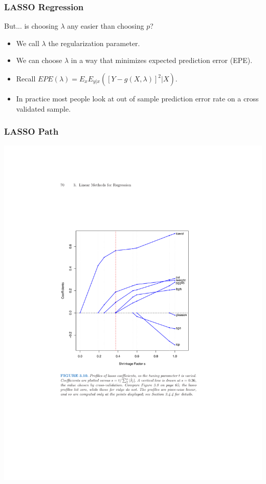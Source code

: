 \documentclass[xcolor=pdftex,dvipsnames,table,mathserif,aspectratio=169]{beamer}
\begin{document}
\begin{frame}
\frametitle{LASSO Regression}
But... is choosing $\lambda$ any easier than choosing $p$?
\begin{itemize}
\item We call $\lambda$ the \alert{regularization} parameter.
\item We can choose $\lambda$ in a way that minimizes expected prediction error (EPE).
\item Recall $EPE(\lambda) = E_x E_{y|x} ([ Y- g(X,\lambda)]^2 | X)$.
\item In practice most people look at out of sample prediction error rate on a \alert{cross validated sample}.
\end{itemize}
\end{frame}

\begin{frame}
\frametitle{LASSO Path}
\begin{center}
\includegraphics[height=0.9\textheight]{./resources/lassopath}
\end{center}
\end{frame}
\end{document}

